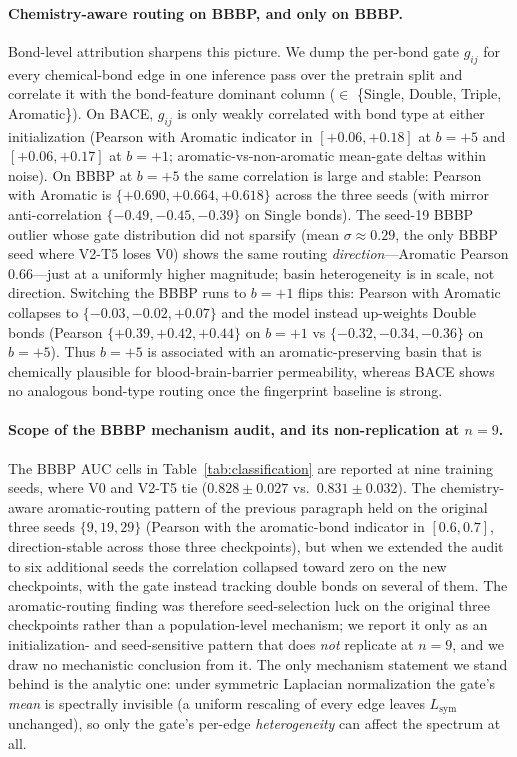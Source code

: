 \documentclass[sigconf,nonacm,anonymous,review]{acmart}
\begin{document}
\paragraph{Chemistry-aware routing on BBBP, and only on BBBP.}
Bond-level attribution sharpens this picture. We dump the per-bond gate $g_{ij}$ for every chemical-bond edge in one inference pass over the pretrain split and correlate it with the bond-feature dominant column ($\in$ \{Single, Double, Triple, Aromatic\}). On BACE, $g_{ij}$ is only weakly correlated with bond type at either initialization (Pearson with Aromatic indicator in $[+0.06, +0.18]$ at $b{=}{+}5$ and $[+0.06, +0.17]$ at $b{=}{+}1$; aromatic-vs-non-aromatic mean-gate deltas within noise). On BBBP at $b{=}{+}5$ the same correlation is large and stable: Pearson with Aromatic is $\{+0.690, +0.664, +0.618\}$ across the three seeds (with mirror anti-correlation $\{-0.49, -0.45, -0.39\}$ on Single bonds). The seed-19 BBBP outlier whose gate distribution did not sparsify (mean $\sigma\approx 0.29$, the only BBBP seed where V2-T5 loses V0) shows the same routing \emph{direction}---Aromatic Pearson $0.66$---just at a uniformly higher magnitude; basin heterogeneity is in scale, not direction. Switching the BBBP runs to $b{=}{+}1$ flips this: Pearson with Aromatic collapses to $\{-0.03, -0.02, +0.07\}$ and the model instead up-weights Double bonds (Pearson $\{+0.39, +0.42, +0.44\}$ on $b{=}{+}1$ vs $\{-0.32, -0.34, -0.36\}$ on $b{=}{+}5$). Thus $b{=}{+}5$ is associated with an aromatic-preserving basin that is chemically plausible for blood-brain-barrier permeability, whereas BACE shows no analogous bond-type routing once the fingerprint baseline is strong.

\paragraph{Scope of the BBBP mechanism audit, and its non-replication at $n{=}9$.}
The BBBP AUC cells in Table~\ref{tab:classification} are reported at nine training seeds, where V0 and V2-T5 tie ($0.828 \pm 0.027$ vs.\ $0.831 \pm 0.032$). The chemistry-aware aromatic-routing pattern of the previous paragraph held on the original three seeds $\{9,19,29\}$ (Pearson with the aromatic-bond indicator in $[0.6, 0.7]$, direction-stable across those three checkpoints), but when we extended the audit to six additional seeds the correlation collapsed toward zero on the new checkpoints, with the gate instead tracking double bonds on several of them. The aromatic-routing finding was therefore seed-selection luck on the original three checkpoints rather than a population-level mechanism; we report it only as an initialization- and seed-sensitive pattern that does \emph{not} replicate at $n{=}9$, and we draw no mechanistic conclusion from it. The only mechanism statement we stand behind is the analytic one: under symmetric Laplacian normalization the gate's \emph{mean} is spectrally invisible (a uniform rescaling of every edge leaves $L_{\mathrm{sym}}$ unchanged), so only the gate's per-edge \emph{heterogeneity} can affect the spectrum at all.
\end{document}
